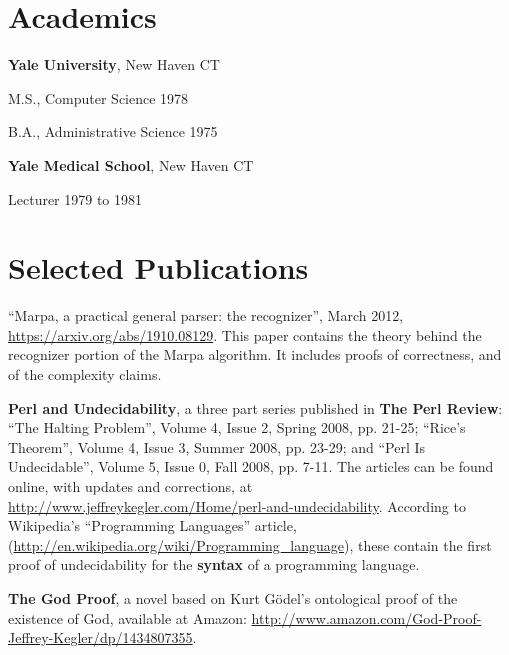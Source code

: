 \documentclass[12pt,margin,line]{res}
\newcommand{\internalskip}{\vspace{-.15in}}
\newenvironment{mylist}{
  \begin{list}{}
  {%
      \setlength{\itemsep}{0in}%
      \setlength{\leftmargin}{0.2in}%
      \setlength{\parsep}{0in}%
      \setlength{\parskip}{0in}%
      \setlength{\partopsep}{0in}%
      \setlength{\topsep}{0in}%
  }
}
{\end{list}}
\begin{document}
\address{\url{http:://www.jeffreykegler.com/}}

\begin{resume}

\section{\sc Academics}
{\bf Yale University}, New Haven CT
\begin{mylist}
\item[] M.S., Computer Science \hfill  1978
\item[] B.A., Administrative Science \hfill  1975
\end{mylist}

\internalskip
{\bf Yale Medical School}, New Haven CT
\begin{mylist}
\item[] Lecturer \hfill 1979 to 1981\\
\end{mylist}
\vspace{-.2in}

\section{\sc Selected Publications}

``Marpa, a practical general parser: the recognizer'',
March 2012,
\url{https://arxiv.org/abs/1910.08129}.
This paper contains the theory behind the
recognizer portion of the
Marpa algorithm.
It includes proofs of correctness, and of the complexity claims.

{\bf Perl and Undecidability}, a three part series published
in {\bf The Perl Review}:
``The Halting Problem'', Volume 4, Issue 2, Spring 2008, pp. 21-25;
``Rice's Theorem'', Volume 4, Issue 3, Summer 2008, pp. 23-29; and
``Perl Is Undecidable'', Volume 5, Issue 0, Fall 2008, pp. 7-11.
The articles can be found online, with updates and corrections,
at \url{http://www.jeffreykegler.com/Home/perl-and-undecidability}.
According to Wikipedia's ``Programming Languages'' article,
(\url{http://en.wikipedia.org/wiki/Programming_language}),
these contain the first proof of undecidability for the {\bf syntax}
of a programming language.

{\bf The God Proof},
a novel based on Kurt G\"{o}del's
ontological proof of the existence
of God,
available at Amazon:
\url{http://www.amazon.com/God-Proof-Jeffrey-Kegler/dp/1434807355}.


\end{resume}
\end{document}
